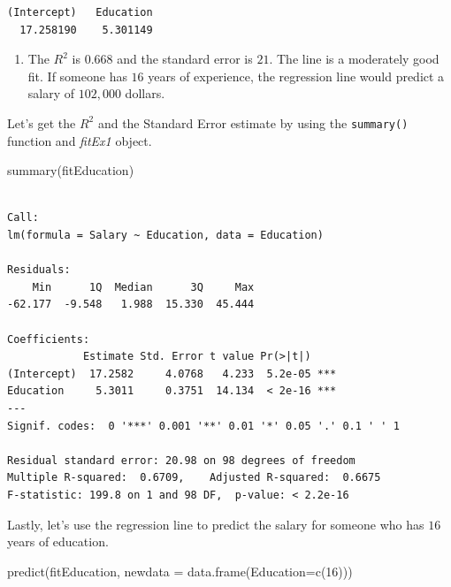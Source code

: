 \documentclass[
  letterpaper,
  DIV=11,
  numbers=noendperiod]{scrreprt}
\newenvironment{Shaded}{\begin{snugshade}}{\end{snugshade}}
\newcommand{\AttributeTok}[1]{\textcolor[rgb]{0.40,0.45,0.13}{#1}}
\newcommand{\DecValTok}[1]{\textcolor[rgb]{0.68,0.00,0.00}{#1}}
\newcommand{\FunctionTok}[1]{\textcolor[rgb]{0.28,0.35,0.67}{#1}}
\newcommand{\NormalTok}[1]{\textcolor[rgb]{0.00,0.23,0.31}{#1}}
\providecommand{\tightlist}{%
  \setlength{\itemsep}{0pt}\setlength{\parskip}{0pt}}\usepackage{longtable,booktabs,array}
\begin{document}
\begin{verbatim}
(Intercept)   Education 
  17.258190    5.301149 
\end{verbatim}

\begin{blackbox}

\begin{enumerate}
\def\labelenumi{\arabic{enumi}.}
\setcounter{enumi}{1}
\tightlist
\item
  The \(R^2\) is \(0.668\) and the standard error is \(21\). The line is
  a moderately good fit. If someone has \(16\) years of experience, the
  regression line would predict a salary of \(102,000\) dollars.
\end{enumerate}

\end{blackbox}

Let's get the \(R^2\) and the Standard Error estimate by using the
\texttt{summary()} function and \emph{fitEx1} object.

\begin{Shaded}
\begin{Highlighting}[numbers=left,,]
\FunctionTok{summary}\NormalTok{(fitEducation)}
\end{Highlighting}
\end{Shaded}

\begin{verbatim}

Call:
lm(formula = Salary ~ Education, data = Education)

Residuals:
    Min      1Q  Median      3Q     Max 
-62.177  -9.548   1.988  15.330  45.444 

Coefficients:
            Estimate Std. Error t value Pr(>|t|)    
(Intercept)  17.2582     4.0768   4.233  5.2e-05 ***
Education     5.3011     0.3751  14.134  < 2e-16 ***
---
Signif. codes:  0 '***' 0.001 '**' 0.01 '*' 0.05 '.' 0.1 ' ' 1

Residual standard error: 20.98 on 98 degrees of freedom
Multiple R-squared:  0.6709,    Adjusted R-squared:  0.6675 
F-statistic: 199.8 on 1 and 98 DF,  p-value: < 2.2e-16
\end{verbatim}

Lastly, let's use the regression line to predict the salary for someone
who has \(16\) years of education.

\begin{Shaded}
\begin{Highlighting}[numbers=left,,]
\FunctionTok{predict}\NormalTok{(fitEducation, }\AttributeTok{newdata =} \FunctionTok{data.frame}\NormalTok{(}\AttributeTok{Education=}\FunctionTok{c}\NormalTok{(}\DecValTok{16}\NormalTok{)))}
\end{Highlighting}
\end{Shaded}
\end{document}
